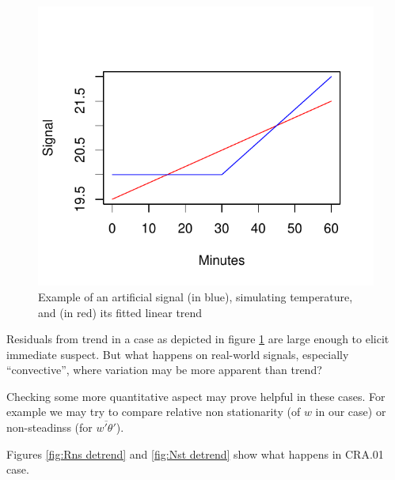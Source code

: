 \documentclass[a4paper,10pt]{book}
\begin{document}
\begin{figure}[htp]
 \centering
 \begin{center}
 \includegraphics[scale=1.1,keepaspectratio=true]{./diagrams/TrendExample.pdf}
 \end{center}
 \caption{Example of an artificial signal (in blue), simulating temperature, and (in red) its fitted linear trend}
 \label{fig:Trend Example}
\end{figure}

Residuals from trend in a case as depicted in figure \ref{fig:Trend Example} are large enough to elicit immediate suspect. But what happens on real-world signals, especially ``convective'', where variation may be more apparent than trend?

Checking some more quantitative aspect may prove helpful in these cases. For example we may try to compare relative non stationarity (of $w$ in our case) or non-steadinss (for $\overline{w'\theta'}$).

Figures \ref{fig:Rns detrend} and \ref{fig:Nst detrend} show what happens in CRA.01 case.
\end{document}
